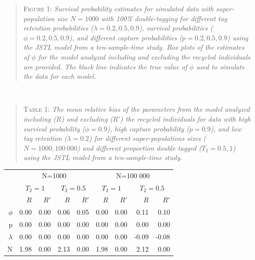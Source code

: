 \documentclass[12pt]{article}
\begin{document}
\begin{quote}
\textsc{Figure 1:}
\textsl{Survival probability estimates for simulated data with super-population size $N=1000$ with 100\% double-tagging for different tag retention probabilities ($\lambda=0.2,0.5,0.9$), survival probabilities ($\phi=0.2,0.5,0.9$), and different capture probabilities ($p=0.2,0.5,0.9$) using the JSTL model from a ten-sample-time study. Box plots of the estimates of $\phi$ for the model analyzed including and excluding the recycled individuals are provided. The black line indicates the true value of $\phi$ used to simulate the data for each model.}
\end{quote}

~ ~

\begin{quote}
\textsc{Table 1:}
\textsl{The mean relative bias of the parameters from the model analyzed including ($R$) and excluding ($R'$) the recycled individuals for data with high survival probability ($\phi=0.9$), high capture probability ($p=0.9$), and low tag retention ($\lambda=0.2$)  for different super-populations sizes ($N=1000,100\ 000$) and different proportion double tagged ($T_2=0.5,1$) using the JSTL model from a ten-sample-time study. }
\end{quote}

\begin{table}[ht]
\centering
\begin{tabular}{rrrrrrrrr}
  \hline
 
  & \multicolumn{4}{c}{N=1000} & \multicolumn{4}{c}{N=100 000} \\

 &\multicolumn{2}{c}{$T_2=1$}  &\multicolumn{2}{c}{$T_2=0.5$} &\multicolumn{2}{c}{$T_2=1$} &\multicolumn{2}{c}{$T_2=0.5$}\\ 

&$R$   &$R'$   &$R$   &$R'$   &$R$   &$R'$   &$R$   &$R'$\\ 
  \hline
$\phi$ & 0.00 & 0.00 & 0.06 & 0.05 & 0.00 & 0.00 & 0.11 & 0.10 \\ 
  p & 0.00 & 0.00 & 0.00 & 0.00 & 0.00 & 0.00 & 0.00 & 0.00 \\ 
  $\lambda$ & 0.00 & 0.00 & 0.00 & 0.00 & 0.00 & 0.00 & -0.09 & -0.08 \\ 
  N & 1.98 & 0.00 & 2.13 & 0.00 & 1.98 & 0.00 & 2.12 & 0.00 \\ 
   \hline
\end{tabular}
\end{table}
\end{document}
